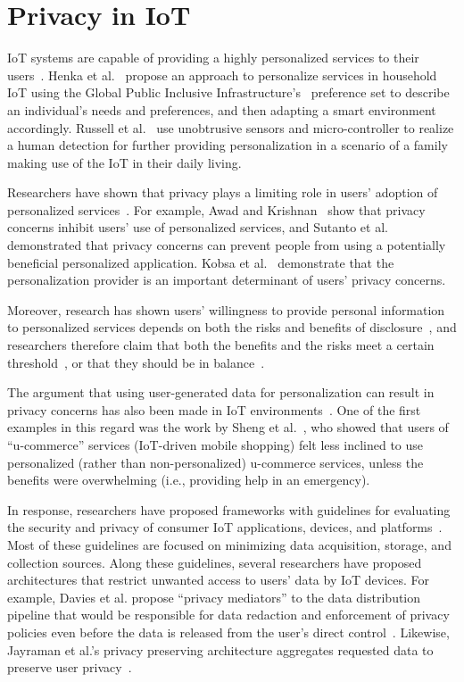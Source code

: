 \section{Privacy in IoT}
IoT systems are capable of providing a highly personalized services to their users~\cite{vallee2016personalization, etzion2014personalization, hemant2015internet}. Henka et al.~\cite{henka2016personalizing} propose an approach to personalize services in household IoT using the Global Public Inclusive Infrastructure's~\cite{vanderheiden2011creating} preference set to describe an individual's needs and preferences, and then adapting a smart environment accordingly. Russell et al.~\cite{russell2015personalization} use unobtrusive sensors and micro-controller to realize a human detection for further providing personalization in a scenario of a family making use of the IoT in their daily living.

Researchers have shown that privacy plays a limiting role in users' adoption of personalized services~\cite{teltzrow_2004}. For example, Awad and Krishnan~\cite{awad_2006} show that privacy concerns inhibit users' use of personalized services, and Sutanto et al.~\cite{sutanto_2013} demonstrated that privacy concerns can prevent people from using a potentially beneficial personalized application. Kobsa et al.~\cite{kobsa_2016} demonstrate that the personalization provider is an important determinant of users' privacy concerns.

Moreover, research has shown  users' willingness to provide personal information to personalized services depends on both the risks and benefits of disclosure~\cite{phelps_2000,ho_2006,hui_2006}, and researchers therefore claim that both the benefits and the risks meet a certain threshold~\cite{treiblmaier_2007}, or that they should be in balance~\cite{chellappa_2005}.

The argument that using user-generated data for personalization can result in privacy concerns has also been made in IoT environments~\cite{worthy_trust_2016, gao2014unified, al2016modeling}. One of the first examples in this regard was the work by Sheng et al.~\cite{sheng_experimental_2008}, who showed that users of ``u-commerce'' services (IoT-driven mobile shopping) felt less inclined to use personalized (rather than non-personalized) u-commerce services, unless the benefits were overwhelming (i.e., providing help in an emergency).

In response, researchers have proposed frameworks with guidelines for evaluating the security and privacy of consumer IoT applications, devices, and platforms~\cite{perera_privacy-by-design_2016, loi_systematically_2017}. Most of these guidelines are focused on minimizing data acquisition, storage, and collection sources. Along these guidelines, several researchers have proposed architectures that restrict unwanted access to users' data by IoT devices. For example, Davies et al. propose ``privacy mediators'' to the data distribution pipeline that would be responsible for data redaction and enforcement of privacy policies even before the data is released from the user's direct control~\cite{davies_privacy_2016}. Likewise, Jayraman et al.'s privacy preserving architecture aggregates requested data to preserve user privacy~\cite{jayaraman_privacy_2017}.

